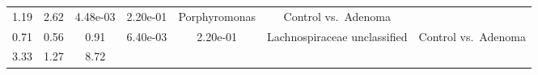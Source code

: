 \documentclass[12pt,]{article}
\begin{document}
\begin{longtable}[]{@{}ccccccc@{}}
\begin{minipage}[t]{0.10\columnwidth}
1.19\strut
\end{minipage} & \begin{minipage}[t]{0.10\columnwidth}\centering\strut
2.62\strut
\end{minipage} & \begin{minipage}[t]{0.08\columnwidth}\centering\strut
4.48e-03\strut
\end{minipage} & \begin{minipage}[t]{0.08\columnwidth}\centering\strut
2.20e-01\strut
\end{minipage} & \begin{minipage}[t]{0.23\columnwidth}\centering\strut
Porphyromonas\strut
\end{minipage} & \begin{minipage}[t]{0.16\columnwidth}\centering\strut
Control vs.~Adenoma\strut
\end{minipage}\tabularnewline
\begin{minipage}[t]{0.06\columnwidth}\centering\strut
0.71\strut
\end{minipage} & \begin{minipage}[t]{0.10\columnwidth}\centering\strut
0.56\strut
\end{minipage} & \begin{minipage}[t]{0.10\columnwidth}\centering\strut
0.91\strut
\end{minipage} & \begin{minipage}[t]{0.08\columnwidth}\centering\strut
6.40e-03\strut
\end{minipage} & \begin{minipage}[t]{0.08\columnwidth}\centering\strut
2.20e-01\strut
\end{minipage} & \begin{minipage}[t]{0.23\columnwidth}\centering\strut
Lachnospiraceae unclassified\strut
\end{minipage} & \begin{minipage}[t]{0.16\columnwidth}\centering\strut
Control vs.~Adenoma\strut
\end{minipage}\tabularnewline
\begin{minipage}[t]{0.06\columnwidth}\centering\strut
3.33\strut
\end{minipage} & \begin{minipage}[t]{0.10\columnwidth}\centering\strut
1.27\strut
\end{minipage} & \begin{minipage}[t]{0.10\columnwidth}\centering\strut
8.72\strut
\end{minipage} & \begin{minipage}[t]{0.08\columnwidth}\centering\strut

\end{minipage}
\end{longtable}
\end{document}
